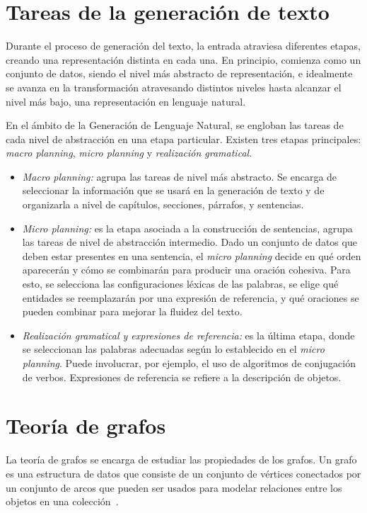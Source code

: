 \section{Tareas de la generación de texto}
\label{sec:tareas_gnl}
Durante el proceso de generación del texto, la entrada atraviesa diferentes etapas, creando una representación distinta en cada una. En principio, comienza como un conjunto de datos, siendo el nivel más abstracto de representación, e idealmente se avanza en la transformación atravesando distintos niveles hasta alcanzar el nivel más bajo, una representación en lenguaje natural. 

En el ámbito de la Generación de Lenguaje Natural, se engloban las tareas de cada nivel de abstracción en una etapa particular. Existen tres etapas principales: \emph{macro planning}, \emph{micro planning} y \emph{realización gramatical}.

\begin{itemize}
    \item  \emph{Macro planning:} agrupa las tareas de nivel más abstracto. Se encarga de seleccionar la información que se usará en la generación de texto y de organizarla a nivel de capítulos, secciones, párrafos, y sentencias.
    \item \emph{Micro planning:} es la etapa asociada a la construcción de sentencias, agrupa las tareas de nivel de abstracción intermedio. Dado un conjunto de datos que deben estar presentes en una sentencia, el \emph{micro planning} decide en qué orden aparecerán y cómo se combinarán para producir una oración cohesiva. 
    Para esto, se selecciona las configuraciones léxicas de las palabras, se elige qué entidades se reemplazarán por una expresión de referencia, y qué oraciones se pueden combinar para mejorar la fluidez del texto.
    \item \emph{Realización gramatical y expresiones de referencia:} es la última etapa, donde se seleccionan las palabras adecuadas según lo establecido en el \emph{micro planning}. Puede involucrar, por ejemplo, el uso de algoritmos de conjugación de verbos. Expresiones de referencia se refiere a la descripción de objetos.
\end{itemize}

\section{Teoría de grafos}
La teoría de grafos se encarga de estudiar las propiedades de los grafos. Un grafo es una estructura de datos que consiste de un conjunto de vértices conectados por un conjunto de arcos que pueden ser usados para modelar relaciones entre los objetos en una colección~\cite{mihalcea2011graph}.

